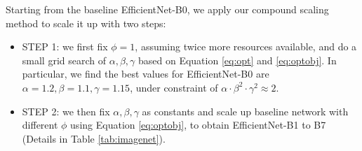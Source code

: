 \documentclass{article}
\begin{document}
\begin{table}
	\vskip -0.1in     
	\caption{	--  Each row describes a stage $i$ with $\hat L_i$ layers, with input resolution $\langle \hat H_i, \hat W_i \rangle$ and output channels $\hat C_i$. Notations are adopted from equation \ref{eq:opt}.
	}
  \vskip 0.05in
  \centering   

              
  \label{tab:efficientnetb0}      
\end{table}                     %

Starting from the baseline EfficientNet-B0, we apply our compound scaling method to scale it up with two steps:

\begin{itemize}
	\setlength\itemsep{0em}
	\item STEP 1: we first fix $\phi=1$, assuming twice more resources available, and do a small grid search of $\alpha, \beta,\gamma$ based on Equation \ref{eq:opt} and \ref{eq:optobj}. In particular, we find the best values for EfficientNet-B0 are $\alpha=1.2, \beta=1.1, \gamma=1.15$, under constraint of $\alpha \cdot \beta ^2 \cdot \gamma^2 \approx 2$. 
	\item STEP 2: we then fix $\alpha, \beta,\gamma$ as constants and scale up baseline network with different $\phi$ using Equation \ref{eq:optobj}, to obtain EfficientNet-B1 to B7 (Details in Table \ref{tab:imagenet}).
\end{itemize}
\end{document}
